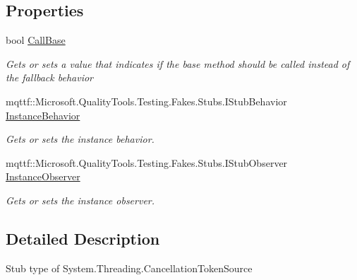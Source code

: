 \subsection*{Properties}
\begin{DoxyCompactItemize}
\item 
bool \hyperlink{class_system_1_1_threading_1_1_fakes_1_1_stub_cancellation_token_source_a9e66b234e3f3ac6ca9d1717681cd787f}{Call\-Base}
\begin{DoxyCompactList}\small\item\em Gets or sets a value that indicates if the base method should be called instead of the fallback behavior\end{DoxyCompactList}\item 
mqttf\-::\-Microsoft.\-Quality\-Tools.\-Testing.\-Fakes.\-Stubs.\-I\-Stub\-Behavior \hyperlink{class_system_1_1_threading_1_1_fakes_1_1_stub_cancellation_token_source_af9475857ea83201de134cf011e4c2e75}{Instance\-Behavior}
\begin{DoxyCompactList}\small\item\em Gets or sets the instance behavior.\end{DoxyCompactList}\item 
mqttf\-::\-Microsoft.\-Quality\-Tools.\-Testing.\-Fakes.\-Stubs.\-I\-Stub\-Observer \hyperlink{class_system_1_1_threading_1_1_fakes_1_1_stub_cancellation_token_source_a2c1f498891df7fab7c35176ee922ce0a}{Instance\-Observer}
\begin{DoxyCompactList}\small\item\em Gets or sets the instance observer.\end{DoxyCompactList}\end{DoxyCompactItemize}


\subsection{Detailed Description}
Stub type of System.\-Threading.\-Cancellation\-Token\-Source




